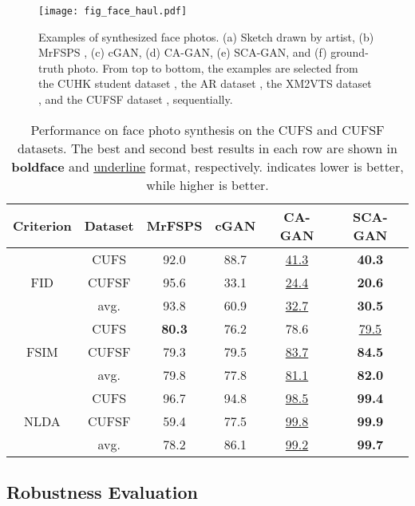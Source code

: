 \documentclass[journal]{IEEEtran}
\begin{document}
\begin{figure}
\centering
\texttt{[image: fig\_face\_haul.pdf]}
   \vspace{-0.4cm}
\caption{Examples of synthesized face photos. (a) Sketch drawn by artist, (b) MrFSPS \cite{Peng2016Multiple}, (c) cGAN, (d) CA-GAN, (e) SCA-GAN, and (f) ground-truth photo. From top to bottom, the examples are selected from the CUHK student dataset \cite{Ref2}, the AR dataset \cite{Ref23}, the XM2VTS dataset \cite{Ref24}, and the CUFSF dataset \cite{Ref32}, sequentially.}
\label{fig:sketch2photo}
\end{figure}


\begin{table}
\centering
\caption{Performance on face photo synthesis on the CUFS and CUFSF datasets. The best and second best results in each row are shown in \textbf{boldface} and \underline{underline} format, respectively.   indicates lower is better, while  higher is better.}
\footnotesize
\label{tab:pfm_photo}
\begin{tabular}{c|c|cccc}
\toprule
Criterion	&	Dataset	&	MrFSPS & cGAN	&	CA-GAN	&	SCA-GAN	\\
\midrule									
	&	CUFS	&	92.0 &	88.7	&	\underline{41.3}	&	\textbf{40.3} 	\\
FID	&	CUFSF	&	95.6 &	33.1	&	\underline{24.4}	&	\textbf{20.6}	\\
	& avg. & 93.8 & 60.9 & \underline{32.7} & \textbf{30.5} \\
\midrule
	&	CUFS	&	\textbf{80.3} &	76.2 	&	78.6 	&	\underline{79.5} 	\\
FSIM&	CUFSF	& 79.3	&	79.5 	&	 \underline{83.7} 	&	\textbf{84.5} 	\\
	& avg.		&	79.8 & 77.8 & \underline{81.1}  & \textbf{82.0} \\
\midrule
	&	CUFS		&	96.7 &	94.8 	&	\underline{98.5} 	&	\textbf{99.4} 	\\
NLDA&	CUFSF	&	59.4 &	77.5 	&	\underline{99.8}  	&	\textbf{ 99.9 } 	\\
	& avg. &  78.2 & 86.1 &  \underline{99.2} & \textbf{99.7} \\
\bottomrule							
\end{tabular}
\vspace{-0.5cm}
\end{table}


\subsection{Robustness Evaluation}
\label{sec:crossdataset}
\end{document}
